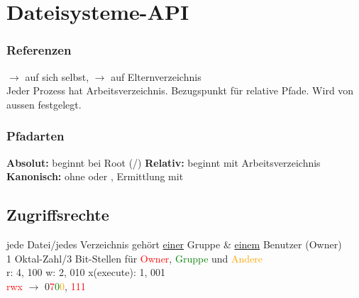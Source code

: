 \section{Dateisysteme-API}
\subsubsection{Referenzen}
$\rightarrow$ auf sich selbst, $\rightarrow$ auf Elternverzeichnis\\
Jeder Prozess hat Arbeitsverzeichnis. Bezugspunkt für relative Pfade. Wird von aussen festgelegt.

\subsubsection{Pfadarten}
\textbf{Absolut:} beginnt bei Root (/)
\textbf{Relativ:} beginnt mit Arbeitsverzeichnis
\textbf{Kanonisch:} ohne  oder , Ermittlung mit 
\subsection{Zugriffsrechte}
jede Datei/jedes Verzeichnis gehört \underline{einer} Gruppe \& \underline{einem} Benutzer (Owner)\\
1 Oktal-Zahl/3 Bit-Stellen für \textcolor{red}{Owner}, \textcolor{green}{Gruppe} und \textcolor{orange}{Andere}\\
r: 4, 100 w: 2, 010 x(execute): 1, 001\\
\textcolor{red}{rwx}\textcolor{green}{\prgc{---}}\textcolor{orange}{\prgc{---}} $\rightarrow$ 0\textcolor{red}{7}\textcolor{green}{0}\textcolor{orange}{0}, \textcolor{red}{111}

